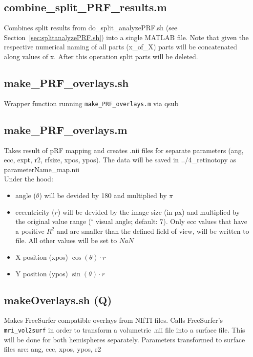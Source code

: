 \documentclass[12pt,a4paper]{scrartcl}
\begin{document}
\subsection{combine\_split\_PRF\_results.m}
Combines split results from do\_split\_analyzePRF.sh (see Section~\ref{sec:splitanalyzePRF.sh}) into a single MATLAB file. Note that given the respective numerical naming of all parts (x\_of\_X) parts will be concatenated along values of x. After this operation split parts will be deleted.

\subsection{make\_PRF\_overlays.sh}
\label{sec:mkprfO}
Wrapper function running \texttt{make\_PRF\_overlays.m} via qsub

\subsection{make\_PRF\_overlays.m}
Takes result of pRF mapping and creates .nii files for separate parameters (ang, ecc, expt, r2, rfsize, xpos, ypos). The data will be saved in ../4\_retinotopy as parameterName\_map.nii\\

\noindent Under the hood:
\begin{itemize}
\item angle ($\theta$) will be devided by 180 and multiplied by $\pi$
\item eccentricity ($r$) will be devided by the image size (in px) and multiplied by the original value range ($^\circ$ visual angle; default: 7). Only ecc values that have a positive $R^2$ and are smaller than the defined field of view, will be written to file. All other values will be set to $NaN$
\item X position (xpos) $\cos(\theta)\cdotp r$
\item Y position (ypos) $\sin(\theta)\cdotp r$
\end{itemize}

\subsection{makeOverlays.sh (Q)}
\label{sec:mkOver}
Makes FreeSurfer compatible overlays from NIfTI files. Calls FreeSurfer's \texttt{mri\_vol2surf} in order to transform a volumetric .nii file into a surface file. This will be done for both hemispheres separately. Parameters transformed to surface files are: ang, ecc, xpos, ypos, r2\\
\end{document}
